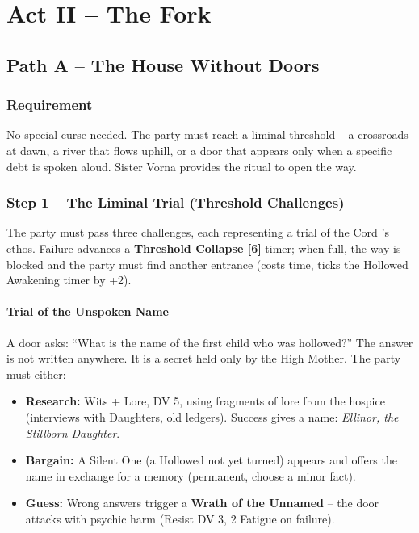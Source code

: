 \documentclass[10pt,twoside]{book}
\begin{document}
\chapter{Act II -- The Fork}

\section{Path A -- The House Without Doors}

\subsection{Requirement}
No special curse needed. The party must reach a liminal threshold -- a crossroads at dawn, a river that flows uphill, or a door that appears only when a specific debt is spoken aloud. Sister Vorna provides the ritual to open the way.

\subsection{Step 1 -- The Liminal Trial (Threshold Challenges)}
The party must pass three challenges, each representing a trial of the Cord 's ethos. Failure advances a \textbf{Threshold Collapse [6]} timer; when full, the way is blocked and the party must find another entrance (costs time, ticks the Hollowed Awakening timer by +2).

\subsubsection*{Trial of the Unspoken Name}
A door asks: ``What is the name of the first child who was hollowed?'' The answer is not written anywhere. It is a secret held only by the High Mother. The party must either:
\begin{itemize}
\item \textbf{Research:} Wits + Lore, DV 5, using fragments of lore from the hospice (interviews with Daughters, old ledgers). Success gives a name: \textit{Ellinor, the Stillborn Daughter}.
\item \textbf{Bargain:} A Silent One (a Hollowed not yet turned) appears and offers the name in exchange for a memory (permanent, choose a minor fact).
\item \textbf{Guess:} Wrong answers trigger a \textbf{Wrath of the Unnamed} -- the door attacks with psychic harm (Resist DV 3, 2 Fatigue on failure).
\end{itemize}
\end{document}

